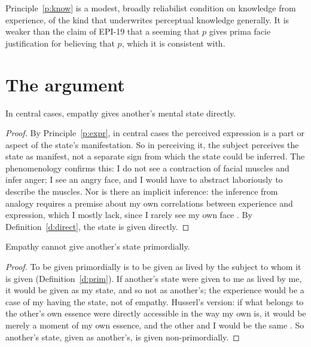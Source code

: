 \documentclass{situationist-preprint}
\begin{document}
Principle~\ref{p:know} is a modest, broadly reliabilist condition on knowledge from experience, of the kind that underwrites perceptual knowledge generally. It is weaker than the claim of EPI-19 that a seeming that $p$ gives prima facie justification for believing that $p$, which it is consistent with.

\section{The argument}

\begin{lemma}[Directness]\label{l:direct}
In central cases, empathy gives another's mental state directly.
\end{lemma}

\begin{proof}
By Principle~\ref{p:expr}, in central cases the perceived expression is a part or aspect of the state's manifestation. So in perceiving it, the subject perceives the state as manifest, not a separate sign from which the state could be inferred. The phenomenology confirms this: I do not see a contraction of facial muscles and infer anger; I see an angry face, and I would have to abstract laboriously to describe the muscles. Nor is there an implicit inference: the inference from analogy requires a premise about my own correlations between experience and expression, which I mostly lack, since I rarely see my own face \citep{Scheler1923}. By Definition~\ref{d:direct}, the state is given directly.
\end{proof}

\begin{lemma}\label{l:nonprim}
Empathy cannot give another's state primordially.
\end{lemma}

\begin{proof}
To be given primordially is to be given as lived by the subject to whom it is given (Definition~\ref{d:prim}). If another's state were given to me as lived by me, it would be given as my state, and so not as another's; the experience would be a case of my having the state, not of empathy. Husserl's version: if what belongs to the other's own essence were directly accessible in the way my own is, it would be merely a moment of my own essence, and the other and I would be the same \citep[\S50]{Husserl1950}. So another's state, given as another's, is given non-primordially.
\end{proof}
\end{document}
